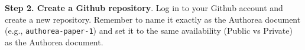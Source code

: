 \textbf{Step 2. Create a Github repository}. Log in to your Github account and create a new repository. Remember to name it exactly as the Authorea document (e.g., \verb|authorea-paper-1|) and set it to the same availability (Public vs Private) as the Authorea document.





